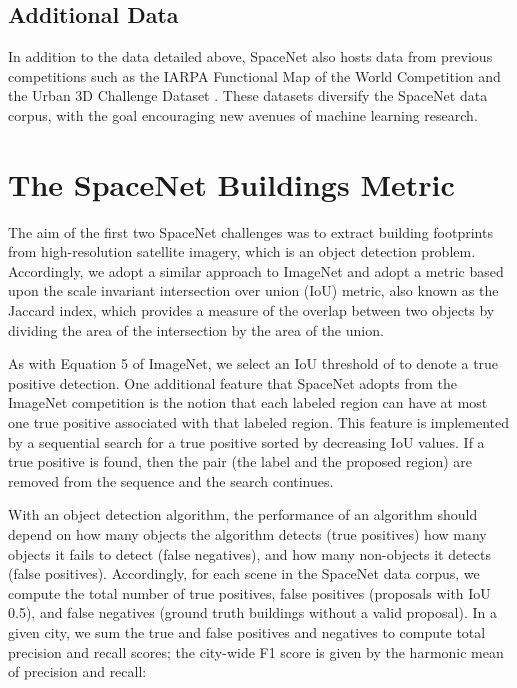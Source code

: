 \documentclass{article}
\begin{document}
\subsection{Additional Data}

In addition to the data detailed above, SpaceNet also hosts data from previous competitions such as the IARPA Functional Map of the World Competition \cite{fmow} and the Urban 3D Challenge Dataset \cite{Urban3D2017}.  These datasets diversify the SpaceNet data corpus, with the goal encouraging new avenues of machine learning research.


\section{The SpaceNet Buildings Metric}

The aim of the first two SpaceNet challenges was to extract building footprints from high-resolution satellite imagery, which is an object detection problem.  Accordingly, we adopt a similar approach to ImageNet \cite{imagenet} and adopt a metric based upon the scale invariant intersection over union (IoU) metric, also known as the Jaccard index, which provides a measure of the overlap between two objects by dividing the area of the intersection by the area of the union. 







As with Equation 5 of ImageNet, we select an IoU threshold of  to denote a true positive detection.  
One additional feature that SpaceNet adopts from the ImageNet competition is the notion that each labeled region can have at most one true positive associated with that labeled region. This feature is implemented by a sequential search for a true positive sorted by decreasing IoU values. If a true positive is found, then the pair (the label and the proposed region)  are removed from the sequence and the search continues. 

With an object detection algorithm, the performance of an algorithm should depend on how many objects the algorithm detects (true positives)
how many objects it fails to detect (false negatives),
and how many non-objects it detects (false positives).
Accordingly, for each scene in the SpaceNet data corpus, we compute the total number of true positives, false positives (proposals with IoU  0.5), and false negatives (ground truth buildings without a valid proposal).  In a given city, we sum the true and false positives and negatives to compute total precision and recall scores; the city-wide F1 score is given by the harmonic mean of precision and recall:
\end{document}
